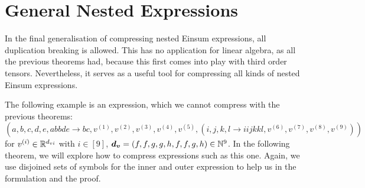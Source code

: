 \section{General Nested Expressions}

In the final generalisation of compressing nested Einsum expressions, all duplication breaking is allowed.
This has no application for linear algebra, as all the previous theorems had, because this first comes into play with third order tensors.
Nevertheless, it serves as a useful tool for compressing all kinds of nested Einsum expressions.

The following example is an expression, which we cannot compress with the previous theorems:
$$(a,b,c,d,e,abbde \rightarrow bc, v^{(1)}, v^{(2)}, v^{(3)}, v^{(4)}, v^{(5)}, (
    i,j,k,l \rightarrow iijkkl, v^{(6)}, v^{(7)}, v^{(8)}, v^{(9)}
    ))$$
for $v^{(i)} \in \mathbb{R}^{d_{vi}}$ with $i \in [9]$, $\bm{d_v} = (f, f, g, g, h, f, f, g, h) \in \mathbb{N}^{9}$.
In the following theorem, we will explore how to compress expressions such as this one.
Again, we use disjoined sets of symbols for the inner and outer expression to help us in the formulation and the proof.

